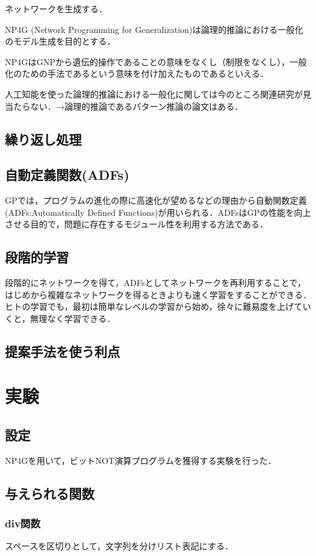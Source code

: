 \documentclass[exploratorypaper]{jsaiart} %
\begin{document}
ネットワークを生成する．

NP4G (Network Programming for Generalization)は論理的推論における一般化のモデル生成を目的とする．

NP4GはGNPから遺伝的操作であることの意味をなくし（制限をなくし），一般化のための手法であるという意味を付け加えたものであるといえる．

人工知能を使った論理的推論における一般化に関しては今のところ関連研究が見当たらない．→論理的推論であるパターン推論の論文はある．
\subsection{繰り返し処理}

\subsection{自動定義関数(ADFs)}
GPでは，プログラムの進化の際に高速化が望めるなどの理由から自動関数定義(ADFs:Automatically Defined Functions)\cite{adfs}が用いられる．ADFsはGPの性能を向上させる目的で，問題に存在するモジュール性を利用する方法である．
\subsection{段階的学習}
段階的にネットワークを得て，ADFsとしてネットワークを再利用することで，はじめから複雑なネットワークを得るときよりも速く学習をすることができる．
ヒトの学習でも，最初は簡単なレベルの学習から始め，徐々に難易度を上げていくと，無理なく学習できる．

\subsection{提案手法を使う利点}

\section{実験}
\subsection{設定}
NP4Gを用いて，ビットNOT演算プログラムを獲得する実験を行った．

\subsection{与えられる関数}
\subsubsection{div関数}
スペースを区切りとして，文字列を分けリスト表記にする．
\end{document}
